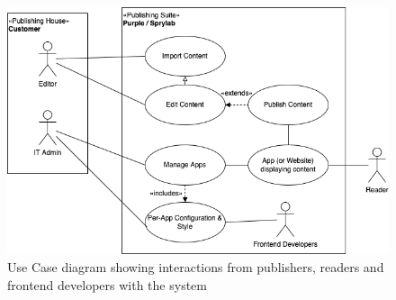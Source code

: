 \begin{figure}[h]
  \caption{Use Case diagram showing interactions from publishers, readers and frontend developers with the system}
  \includegraphics[width=\textwidth]{pics/purple-abstract.drawio.png}
\end{figure}

